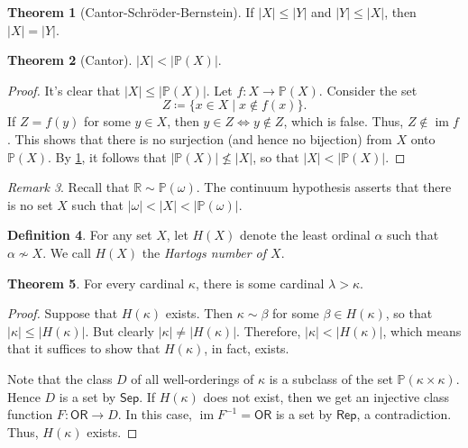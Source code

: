 \documentclass[10pt,letterpaper,cm]{nupset}
\theoremstyle{definition}
\newtheorem{definition}{Definition}[subsection]
\theoremstyle{theorem}
\newtheorem{theorem}[definition]{Theorem}
\theoremstyle{remark}
\newtheorem{remark}[definition]{Remark}
\renewcommand{\P}{\mathbb P}
\newcommand{\R}{\mathbb R}
\newcommand{\1}{\mathbf{1}}
\newcommand{\0}{\vec 0}
\newcommand{\ord}{\mathsf{OR}}
\DeclareMathOperator{\im}{im}
\begin{document}
\begin{theorem}[Cantor-Schr\"oder-Bernstein]\label{CSB}
If $\left\lvert{X}\right\rvert\leq \left\lvert{Y}\right\rvert$ and $\left\lvert{Y}\right\rvert\leq \left\lvert{X}\right\rvert$, then $\left\lvert{X}\right\rvert = \left\lvert{Y}\right\rvert$.
\end{theorem}


\begin{theorem}[Cantor]
$\left\lvert{X}\right\rvert < \left\lvert{\P(X)}\right\rvert$.
\end{theorem}
\begin{proof}
It's clear that $\left\lvert{X}\right\rvert \leq \left\lvert{\P(X)}\right\rvert$. Let $f: X \to \P(X)$. Consider the set $$Z\coloneqq \{x\in X \mid x \notin f(x)    \} .$$ If $Z= f(y)$ for some $y\in X$, then $y\in Z \iff y\notin Z$, which is false. Thus, $Z\notin \im{f}$. This shows that there is no surjection (and hence no bijection) from $X$ onto $\P(X)$. By \cref{CSB}, it follows that   $\left\lvert{\P(X)}\right\rvert \not \leq \left\lvert{X}\right\rvert$, so that $\left\lvert{X}\right\rvert < \left\lvert{\P(X)}\right\rvert$.
\end{proof}


\begin{remark}
Recall that $\R \sim \P(\omega)$. The continuum hypothesis asserts that there is no set $X$ such that $\left\lvert{\omega}\right\rvert < \left\lvert{X}\right\rvert < \left\lvert{\P(\omega)}\right\rvert$.
\end{remark}

\begin{definition}
For any set $X$, let $H(X)$ denote the least ordinal $\alpha$  such that $\alpha \not \sim X$. We call $H(X)$ the \textit{Hartogs number of $X$}. 
\end{definition}


\begin{theorem}
For every cardinal $\kappa$, there is some cardinal $\lambda > \kappa$.
\end{theorem}
\begin{proof}
Suppose that $H(\kappa)$ exists. Then $\kappa \sim \beta$ for some $ \beta \in H(\kappa) $, so that $\left\lvert{\kappa}\right\rvert \leq \left\lvert{H(\kappa)}\right\rvert$. But clearly  $\left\lvert{\kappa}\right\rvert \ne \left\lvert{H(\kappa)}\right\rvert$. Therefore, $\left\lvert{\kappa}\right\rvert < \left\lvert{H(\kappa)}\right\rvert$, which means that it suffices to show that $H(\kappa)$, in fact, exists.

\smallskip
 Note that the class $D$ of all well-orderings of $\kappa$ is a subclass of the set $\P(\kappa \times \kappa)$. Hence $D$ is a set by $\mathsf{Sep}$. If  $H(\kappa)$ does not exist, then we get an injective class function $F: \ord \to D$. In this case, $\im{F^{-1}} = \ord$ is a set by $\mathsf{Rep}$, a contradiction. Thus, $H(\kappa)$ exists. 
\end{proof}
\end{document}
